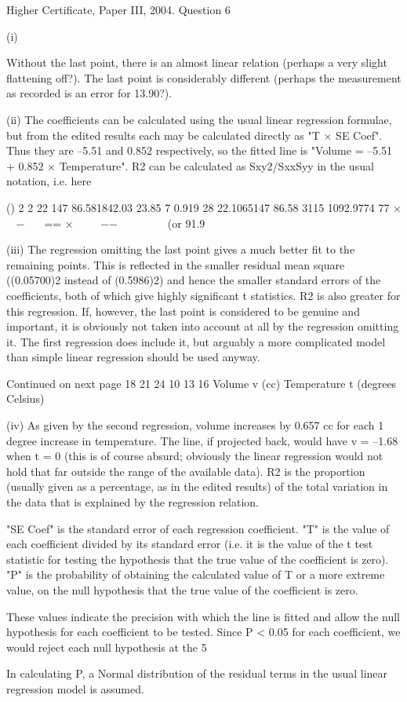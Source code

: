 \documentclass[a4paper,12pt]{article}
\begin{document}
Higher Certificate, Paper III, 2004.  Question 6 
 
(i) 
 
Without the last point, there is an almost linear relation (perhaps a very slight flattening off?).  The last point is considerably different (perhaps the measurement as recorded is an error for 13.90?). 
 
 
(ii) The coefficients can be calculated using the usual linear regression formulae, but from the edited results each may be calculated directly as "T × SE Coef".  Thus they are –5.51 and 0.852 respectively, so the fitted line is 
 "Volume  =  –5.51  +  0.852 × Temperature". 
 R2 can be calculated as Sxy2/SxxSyy in the usual notation, i.e. here 
 
()
2
2
22 147 86.581842.03 23.85 7 0.919 28 22.1065147 86.58 3115 1092.9774 77 ×  −  == ×    −−       (or 91.9%
 
 
(iii) The regression omitting the last point gives a much better fit to the remaining points.  This is reflected in the smaller residual mean square ((0.05700)2 instead of (0.5986)2) and hence the smaller standard errors of the coefficients, both of which give highly significant t statistics.  R2 is also greater for this regression.  If, however, the last point is considered to be genuine and important, it is obviously not taken into account at all by the regression omitting it.  The first regression does include it, but arguably a more complicated model than simple linear regression should be used anyway. 
 
Continued on next page 
18 21 24 
10
13
16
Volume v (cc)
Temperature t (degrees Celsius) 

 
 
(iv) As given by the second regression, volume increases by 0.657 cc for each 1 degree increase in temperature.  The line, if projected back, would have v = –1.68 when t = 0 (this is of course absurd;  obviously the linear regression would not hold that far outside the range of the available data). 
 R2 is the proportion (usually given as a percentage, as in the edited results) of the total variation in the data that is explained by the regression relation. 
 
"SE Coef" is the standard error of each regression coefficient.  "T" is the value of each coefficient divided by its standard error (i.e. it is the value of the t test statistic for testing the hypothesis that the true value of the coefficient is zero).  "P" is the probability of obtaining the calculated value of T or a more extreme value, on the null hypothesis that the true value of the coefficient is zero. 
 
These values indicate the precision with which the line is fitted and allow the null hypothesis for each coefficient to be tested.  Since P < 0.05 for each coefficient, we would reject each null hypothesis at the 5%
 
In calculating P, a Normal distribution of the residual terms in the usual linear regression model is assumed. 
 
 
\end{document}
